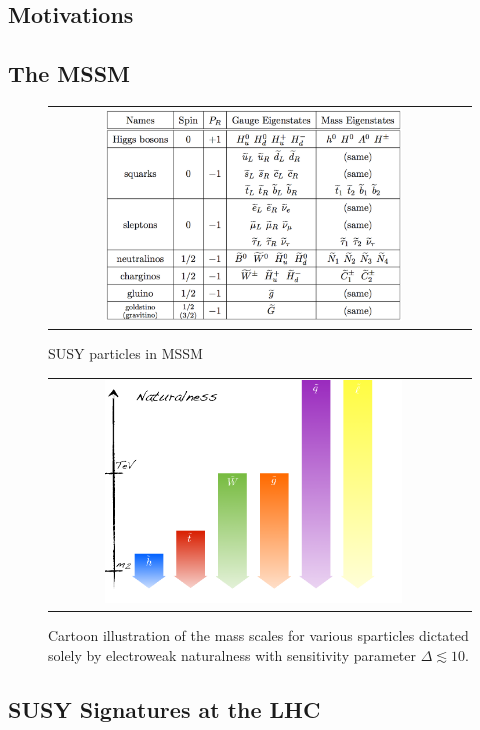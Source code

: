 \subsection{Motivations}

\subsection{The MSSM}

\begin{figure}[tbh!]
	\centering
	\begin{tabular}{cc}
		\includegraphics[width=0.75\textwidth]{theory/pics/SUSY_particles_table.png}
	\end{tabular}
	\caption{SUSY particles in MSSM~\protect\cite{Martin:1997ns}}
	\label{fig:SUSY_particles_table}
\end{figure}

\begin{figure}[tbh!]
	\centering
	\begin{tabular}{cc}
		\includegraphics[width=0.75\textwidth]{theory/pics/SUSY_naturalness.png}
	\end{tabular}
	\caption{Cartoon illustration of the mass scales for various sparticles dictated solely by electroweak naturalness with sensitivity parameter $\Delta \lesssim 10$.}
	\label{fig:SUSY_naturalness}
\end{figure}




\subsection{SUSY Signatures at the LHC}
